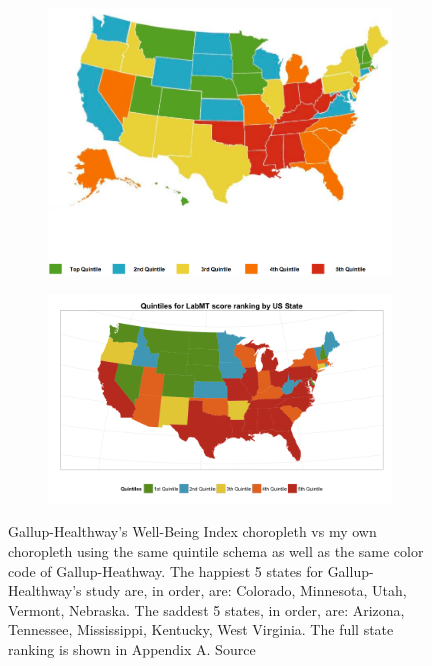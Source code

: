 \documentclass{llncs}
\begin{document}
\begin{figure}
\begin{subfigure}[b]{\textwidth}
\centering
\includegraphics[width=\textwidth]{images/gallup_2012}
\end{subfigure}
\begin{subfigure}[b]{\textwidth}
\includegraphics[width=\textwidth]{images/scores_by_state_gallup_style}
\end{subfigure}
\caption{Gallup-Healthway's Well-Being Index choropleth vs my own choropleth using the same quintile schema as well as the same color code of Gallup-Heathway. The happiest 5 states for Gallup-Healthway's study are, in order, are: Colorado, Minnesota, Utah, Vermont, Nebraska. The saddest 5 states, in order, are: Arizona, Tennessee, Mississippi, Kentucky, West Virginia. The full state ranking is shown in Appendix A. Source \cite{GallupHealthway2013}}
\label{fig:gallup_vs_labmt}
\end{figure}
\end{document}

